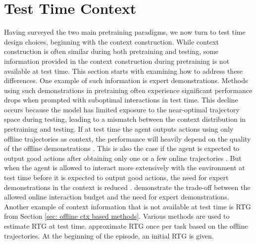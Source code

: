 \documentclass{article}
\begin{document}
\section{Test Time Context} \label{sec: test time cond}
Having surveyed the two main pretraining paradigms,
we now turn to test time design choices, beginning with the context construction.
While context construction is often similar during both pretraining and testing,
some information provided in the context construction during pretraining is not available at test time.
This section starts with examining how to address these differences.
One example of such information is expert demonstrations.
Methods using such demonstrations in pretraining \citep{rakellyEfficientOffPolicyMetaReinforcement2019,leeSupervisedPretrainingCan2023,wangHierarchicalPromptDecision2024} often experience significant performance drops when prompted with suboptimal interactions in test time.
This decline occurs because the model has limited exposure to the near-optimal trajectory space during testing, leading to a mismatch between the context distribution in pretraining and testing.
If at test time the agent outputs actions using only offline trajectories as context,
the performance will heavily depend on the quality of the offline demonstrations \citep{leeSupervisedPretrainingCan2023}.
This is also the case if the agent is expected to output good actions after obtaining only one or a few online trajectories \citep{raparthyGeneralizationNewSequential2023,wangHierarchicalPromptDecision2024}.
But when the agent is allowed to interact more extensively with the environment at test time before it is expected to output good actions,
the need for expert demonstrations in the context is reduced \citep{laskinContextReinforcementLearning2022,huangContextDecisionTransformer2024,huangDecisionMambaReinforcement2024,siniiContextReinforcementLearning2024,kirschGeneralPurposeContextLearning2023,leeSupervisedPretrainingCan2023}.
\citet{leeSupervisedPretrainingCan2023} demonstrate the trade-off between the allowed online interaction budget and the need for expert demonstrations.
Another example of context information that is not available at test time is RTG from Section \ref{sec: offline ctx based methods}.
Various methods are used to estimate RTG at test time.
\citet{huangDecisionMambaReinforcement2024,huangContextDecisionTransformer2024,xuPromptingDecisionTransformer2022,schmiedLargeRecurrentAction2024,wangHierarchicalPromptDecision2024}
approximate RTG once per task based on the offline trajectories.
At the beginning of the episode,
an initial RTG is given.
\end{document}
